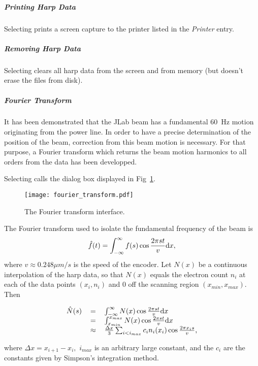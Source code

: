 {	\subparagraph{Printing Harp Data}

Selecting  prints a screen capture to the printer listed in the {\it Printer} entry.

	\subparagraph{Removing Harp Data}

Selecting  clears all harp data from the screen and from memory (but doesn't
erase the files from disk).


	\subparagraph{Fourier Transform}

It has been demonstrated that the JLab beam has a fundamental 60~Hz motion originating from the power
line. In order to have a precise determination of the position of the beam, correction from this beam
motion is necessary. For that purpose, a Fourier transform which returns the beam motion harmonics to
all orders from the data has been developped.

Selecting  calls the dialog box displayed in Fig~\ref{fig:transform}.
\begin{figure}[htp]
\texttt{[image: fourier\_transform.pdf]}
\caption{The Fourier transform interface.}\label{fig:transform}
\end{figure}
The Fourier transform used to isolate the fundamental frequency of the beam is
\begin{equation}
\hat f(t)=\int_{-\infty}^\infty f(s)\cos \frac{2 \pi s t}{v} {\rm d}x,
\end{equation}
where $v\approx 0.248\mu m/s$ is the speed of the encoder.  Let $N(x)$ be a continuous interpolation of
the harp data, so that $N(x)$ equals the electron count $n_i$ at each of the data points $(x_i, n_i)$ and
0 off the scanning region $(x_{min}, x_{max})$. Then
\begin{center}
\begin{equation}
\begin{tabular}{rcl}
$\hat N(s)$&$=$&$\int_{-\infty}^\infty N(x)\cos \frac{2 \pi s t}{v} {\rm d}x$ \\
	   &$=$&$\int_{x_{min}}^{x_{max}} N(x)\cos \frac{2 \pi s t}{v} {\rm d}x $\\
	   &$\approx$&$ \frac{\Delta x}{3}\sum_{i<i_{max}} c_i n_i(x_i) \cos \frac{2 \pi x_i s}{v}$,
\end{tabular}
\end{equation}
\end{center}
where $\Delta x=x_{i+1}-x_i,$ $i_{max}$ is an arbitrary large constant, and the $c_i$ are the constants given
by Simpson's integration method.

}
